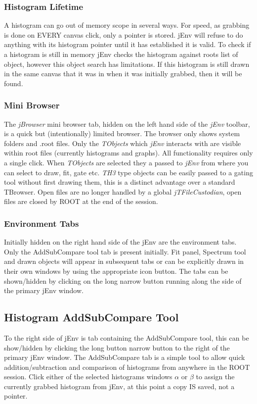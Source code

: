 \documentclass[a4paper,10pt]{article}
\begin{document}
\subsubsection{Histogram Lifetime}
A histogram can go out of memory scope in several ways. For speed, as grabbing is done on EVERY canvas click, only a pointer is stored. jEnv will refuse to do anything with its histogram pointer until it has established it is valid. To check if a histogram is still in memory jEnv checks the histogram against roots list of object, however this object search has limitations. If this histogram is still drawn in the same canvas that it was in when it was initially grabbed, then it will be found.

\subsubsection{Mini Browser}

The \textit{jBrowser} mini browser tab, hidden on the left hand side of the \textit{jEnv} toolbar, is a quick but (intentionally) limited browser.
The browser only shows system folders and .root files.
Only the \textit{TObjects} which \textit{jEnv} interacts with are visible within root files (currently histograms and graphs).
All functionality requires only a single click.
When \textit{TObjects} are selected they a passed to \textit{jEnv} from where you can select to draw, fit, gate etc.
 \textit{TH3} type objects can be easily passed to a gating tool without first drawing them, this is a distinct advantage over a standard TBrowser.
 Open files are no longer handled by a global \textit{jTFileCustodian}, open files are closed by ROOT at the end of the session.

\subsubsection{Environment Tabs}
Initially hidden on the right hand side of the jEnv are the environment tabs. Only the AddSubCompare tool tab is present initially. Fit panel, Spectrum tool and drawn objects will appear in subsequent tabs or can be explicitly drawn in their own windows by using the appropriate icon button.
The tabs can be shown/hidden by clicking on the long narrow button running along the side of the primary jEnv window.

\newpage
\subsection{Histogram AddSubCompare Tool}
To the right side of jEnv is tab containing the AddSubCompare tool, this can be show/hidden by clicking the long button narrow button to the right of the primary jEnv window. The AddSubCompare tab is a simple tool to allow quick addition/subtraction and comparison of histograms from anywhere in the ROOT session.
Click either of the selected histograms windows $\alpha$ or $\beta$ to assign the currently grabbed histogram from jEnv, at this point a copy IS saved, not a pointer.
\end{document}
